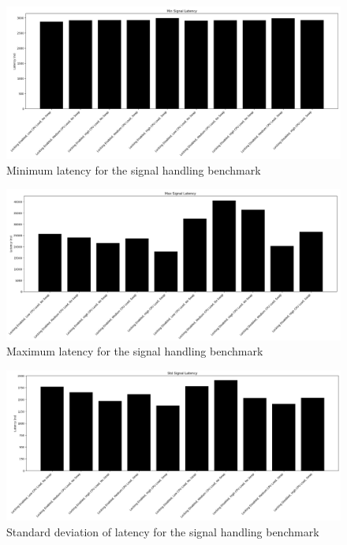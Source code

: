 \documentclass[a4paper]{article}
\begin{document}
\begin{figure}[H]
    \centering
    \includegraphics[width=\textwidth]{./images/signal-min.png}
    \caption{Minimum latency for the signal handling benchmark}
\end{figure}

\begin{figure}[H]
    \centering
    \includegraphics[width=\textwidth]{./images/signal-max.png}
    \caption{Maximum latency for the signal handling benchmark}
\end{figure}

\begin{figure}[H]
    \centering
    \includegraphics[width=\textwidth]{./images/signal-std.png}
    \caption{Standard deviation of latency for the signal handling benchmark}
\end{figure}
\end{document}

